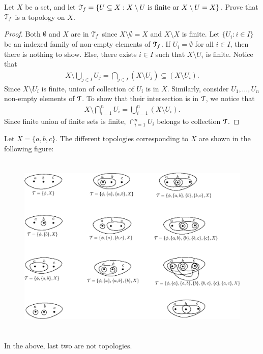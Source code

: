 \documentclass[a4paper,english,12pt]{article}   	%
\begin{document}
\begin{exmp} 
 Let $X$ be a set, and let $\mathcal{T}_f = \{U\subseteq X : X \setminus U \text{ is finite or }X \setminus U= X\}$. Prove that $\mathcal{T}_f$ is a topology on $X$.
\begin{proof}
Both $\emptyset$ and $X$ are in $\mathcal{T}_f$ since $X \setminus \emptyset = X$ and $X \setminus X$ is finite. Let $\{U_i: i \in I \}$ be an indexed family of non-empty elements of $\mathcal{T}_f$. If $U_i = \emptyset$ for all $i \in I$, then there is nothing to show. Else, there exists $i \in I$ such that $X \setminus U_i$ is finite.  %
Notice that
\begin{align*}
X\setminus\bigcup_{j \in I}U_j=\bigcap_{j \in {I}}(X\setminus U_j)\subseteq (X\setminus U_i).
\end{align*}
Since $X\setminus U_i$ is finite, union of collection of $U_i$ is in $X$. Similarly, consider $U_1,\ldots,U_n$ non-empty elements of $\mathcal{T}$. To show that their intersection is in $\mathcal{T}$, we notice that
\begin{align*} 
X \setminus \bigcap_{i = 1}^nU_i=\bigcup_{i = 1}^n(X\setminus U_i).
\end{align*}
Since finite union of finite sets is finite, $\cap_{i=1}^{n}U_i$ belongs to collection $\mathcal{T}$. 
 \end{proof}
 \end{exmp}
 
\begin{exmp} Let $X=\{a,b,c\}$. The different topologies corresponding to $X$ are shown in the following figure:
\begin{figure}[!h]
 \centering
 \includegraphics[height=3.5in]{fig133.eps}
\end{figure}

In the above, last two are not topologies.
\end{exmp}
\end{document}
